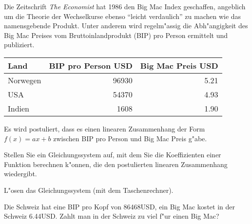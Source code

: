 Die Zeitschrift {\em The Economist} hat 1986 den Big Mac Index geschaffen,
angeblich um die Theorie der Wechselkurse ebenso ``leicht verdaulich''
zu machen wie das namensgebende Produkt.
Unter anderem wird regelm"assig die Abh"angigkeit des Big Mac Preises
vom Bruttoinlandprodukt (BIP) pro Person ermittelt und publiziert.
\begin{center}
\begin{tabular}{|l|r|r|}
\hline
Land&BIP pro Person USD&Big Mac Preis USD\\
\hline
Norwegen&96930&5.21\\
USA&54370&4.93\\
Indien&1608&1.90\\
\hline
\end{tabular}
\end{center}
Es wird postuliert, dass es einen linearen Zusammenhang der Form $f(x)=ax+b$
zwischen BIP pro Person und Big Mac Preis g"abe.

\begin{teilaufgaben}
\item Stellen Sie ein Gleichungssystem auf, mit dem Sie die Koeffizienten
einer Funktion berechnen k"onnen, die den postulierten linearen Zusammenhang
wiedergibt.
\item L"osen das Gleichungssystem (mit dem Taschenrechner).
\item Die Schweiz hat eine BIP pro Kopf von 86468USD, ein Big Mac kostet
in der Schweiz 6.44USD.
Zahlt man in der Schweiz zu viel f"ur einen Big Mac?
\end{teilaufgaben}

